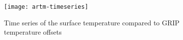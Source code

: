 \begin{figure}[ht]
  \centering
  \texttt{[image: artm-timeseries]}
  \caption{Time series of the surface temperature compared to GRIP temperature offsets}
  \label{fig:artm-timeseries}
\end{figure}

\begin{comment}
  FIXME: Variable acab in following is worth looking at. It looks right and it
  may be possible to compare to other paleo-limate studies:
\begin{verbatim}
$ pclimate -i green20km_y1.nc -o bar.nc -ys -125000.0 -ye -0.0 -dt 1000.0 \
           -dTforcing grip_dT.nc -dSLforcing specmap_dSL.nc \
           -atmosphere eismint_greenland,forcing -surface pdd -ocean constant,forcing
\end{verbatim}%
\end{comment}


